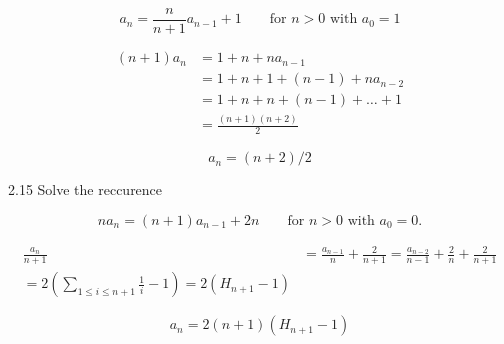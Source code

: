 \documentclass[12pt]{article}
\begin{document}
\begin{equation}
a_{n} = \frac{n}{n + 1}a_{n-1} + 1 \qquad \text{for ${n > 0}$ with ${a_{0} = 1}$} \nonumber
\end{equation}

\begin{equation}
\begin{split}
(n + 1)a_{n} & = 1 + n + na_{n - 1} \\
	     & = 1 + n + 1 + (n - 1) + na_{n - 2} \\
	     & = 1 + n + n + (n - 1) + \dots + 1 \\
	     & = \frac{(n + 1)(n + 2)}{2} \nonumber
\end{split}
\end{equation}

\begin{equation}
	a_{n} = (n + 2)/2 \nonumber
\end{equation}


\bigskip

2.15
Solve the reccurence

\begin{equation}
na_{n} = (n + 1)a_{n - 1} + 2n \qquad \text{for ${n > 0}$ with ${a_{0} = 0}$.} \nonumber
\end{equation}

\begin{equation}
\begin{split}
\frac{a_{n}}{n + 1} & = \frac{a_{n - 1}}{n} + \frac{2}{n + 1} = \frac{a_{n - 2}}{n - 1} + \frac{2}{n} + \frac{2}{n + 1} \\
	= 2(\sum_{1 \leq i \leq n + 1}\frac{1}{i} - 1) = 2(H_{n + 1} - 1) \nonumber
\end{split}
\end{equation}


\begin{equation}
a_{n} = 2(n + 1)(H_{n + 1} - 1) \nonumber
\end{equation}
\end{document}
